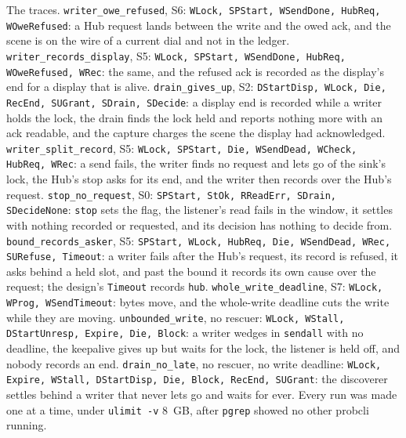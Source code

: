 \documentclass[a4paper,10pt,fleqn]{article}
\begin{document}
The traces.  \texttt{writer\_owe\_refused}, S6: \texttt{WLock, SPStart,
WSendDone, HubReq, WOweRefused}: a Hub request lands between the write and the
owed ack, and the scene is on the wire of a current dial and not in the ledger.
\texttt{writer\_records\_display}, S5: \texttt{WLock, SPStart, WSendDone,
HubReq, WOweRefused, WRec}: the same, and the refused ack is recorded as the
display's end for a display that is alive.  \texttt{drain\_gives\_up}, S2:
\texttt{DStartDisp, WLock, Die, RecEnd, SUGrant, SDrain, SDecide}: a display end
is recorded while a writer holds the lock, the drain finds the lock held and
reports nothing more with an ack readable, and the capture charges the scene the
display had acknowledged.  \texttt{writer\_split\_record}, S5: \texttt{WLock,
SPStart, Die, WSendDead, WCheck, HubReq, WRec}: a send fails, the writer finds no
request and lets go of the sink's lock, the Hub's stop asks for its end, and the
writer then records over the Hub's request.  \texttt{stop\_no\_request}, S0:
\texttt{SPStart, StOk, RReadErr, SDrain, SDecideNone}: \texttt{stop} sets the
flag, the listener's read fails in the window, it settles with nothing recorded
or requested, and its decision has nothing to decide from.
\texttt{bound\_records\_asker}, S5: \texttt{SPStart, WLock, HubReq, Die,
WSendDead, WRec, SURefuse, Timeout}: a writer fails after the Hub's request, its
record is refused, it asks behind a held slot, and past the bound it records its
own cause over the request; the design's \texttt{Timeout} records \texttt{hub}.
\texttt{whole\_write\_deadline}, S7: \texttt{WLock, WProg, WSendTimeout}: bytes
move, and the whole-write deadline cuts the write while they are moving.
\texttt{unbounded\_write}, no rescuer: \texttt{WLock, WStall, DStartUnresp,
Expire, Die, Block}: a writer wedges in \texttt{sendall} with no deadline, the
keepalive gives up but waits for the lock, the listener is held off, and nobody
records an end.  \texttt{drain\_no\_late}, no rescuer, no write deadline:
\texttt{WLock, Expire, WStall, DStartDisp, Die, Block, RecEnd, SUGrant}: the
discoverer settles behind a writer that never lets go and waits for ever.  Every
run was made one at a time, under \texttt{ulimit -v} 8~GB, after \texttt{pgrep}
showed no other probcli running.
\end{document}
